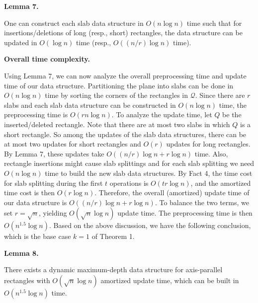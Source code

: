 \documentclass[10pt,a4paper]{article}
\begin{document}
\par
\par
\par\medskip\noindent\textbf{Lemma 7.}\par
One can construct each slab data structure in $O(n\log n)$ time such that for insertions/deletions of long (resp., short) rectangles, the data structure can be updated in $O(\log n)$ time (resp., $O((n/r)\log n)$ time).
\par
\par
\par
\par\medskip\noindent\textbf{Overall time complexity.}\par
Using Lemma 7, we can now analyze the overall preprocessing time and update time of our data structure. Partitioning the plane into slabs can be done in $O(n\log n)$ time by sorting the corners of the rectangles in $\mathcal{Q}$. Since there are $r$ slabs and each slab data structure can be constructed in $O(n\log n)$ time, the preprocessing time is $O(rn\log n)$. To analyze the update time, let $Q$ be the inserted/deleted rectangle. Note that there are at most two slabs in which $Q$ is a short rectangle. So among the updates of the slab data structures, there can be at most two updates for short rectangles and $O(r)$ updates for long rectangles. By Lemma 7, these updates take $O((n/r)\log n+r\log n)$ time. Also, rectangle insertions might cause slab splittings and for each slab splitting we need $O(n\log n)$ time to build the new slab data structures. By Fact 4, the time cost for slab splitting during the first $t$ operations is $O(tr\log n)$, and the amortized time cost is then $O(r\log n)$. Therefore, the overall (amortized) update time of our data structure is $O((n/r)\log n+r\log n)$. To balance the two terms, we set $r=\sqrt{n}$, yielding $O(\sqrt{n}\log n)$ update time. The preprocessing time is then $O(n^{1.5}\log n)$. Based on the above discussion, we have the following conclusion, which is the base case $k=1$ of Theorem 1.
\par
\par
\par\medskip\noindent\textbf{Lemma 8.}\par
There exists a dynamic maximum-depth data structure for axis-parallel rectangles with $O(\sqrt{n}\log n)$ amortized update time, which can be built in $O(n^{1.5}\log n)$ time.
\end{document}
